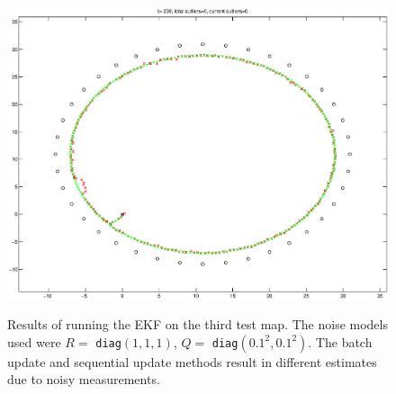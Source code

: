 \documentclass[a4paper,12pt]{article}
\begin{document}
\begin{figure}
{{      \includegraphics[width=.43\textwidth]{figures/ekf/map3_batch_motion}
    }
    \label{fig:m3batch}
  }
  
  \caption{Results of running the EKF on the third test map. The noise models
    used were $R=$ \texttt{diag}$(1, 1, 1)$, $Q=$ \texttt{diag}$(0.1^2,
    0.1^2)$. The batch update and sequential update methods result in different
    estimates due to noisy measurements.}
  \label{fig:map3}
\end{figure}
\end{document}

